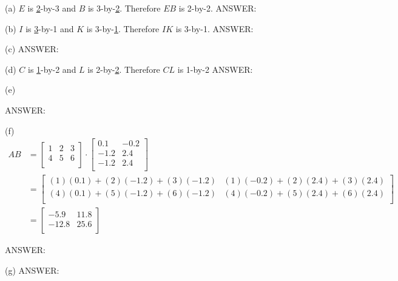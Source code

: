 
\SOLUTION

(a)
$E$ is \underline{2}-by-3 and $B$ is 3-by-\underline{2}.
Therefore $EB$ is 2-by-2.
ANSWER: 

(b)
$I$ is \underline{3}-by-1 and $K$ is 3-by-\underline{1}.
Therefore $IK$ is 3-by-1.
ANSWER: 

(c)
ANSWER: 

(d)
$C$ is \underline{1}-by-2 and $L$ is 2-by-\underline{2}.
Therefore $CL$ is 1-by-2
ANSWER: 

(e)

ANSWER: 


(f) 
\begin{align*}
AB &= \begin{bmatrix}
      1 & 2 & 3 \\
      4 & 5 & 6 \\
      \end{bmatrix}
      \cdot
      \begin{bmatrix}
      0.1 & -0.2 \\
      -1.2 & 2.4 \\
      -1.2 & 2.4 \\
      \end{bmatrix}
\\
   &= \begin{bmatrix}
      (1)(0.1) + (2)(-1.2) + (3)(-1.2) & (1)(-0.2) + (2)(2.4) + (3)(2.4) \\
       (4)(0.1) + (5)(-1.2) + (6)(-1.2) & (4)(-0.2) + (5)(2.4) + (6)(2.4) \\  
      \end{bmatrix}
\\
   &= \begin{bmatrix}
      -5.9 & 11.8 \\
      -12.8 & 25.6 \\  
      \end{bmatrix}
\end{align*}

ANSWER: 

(g)
ANSWER: 


